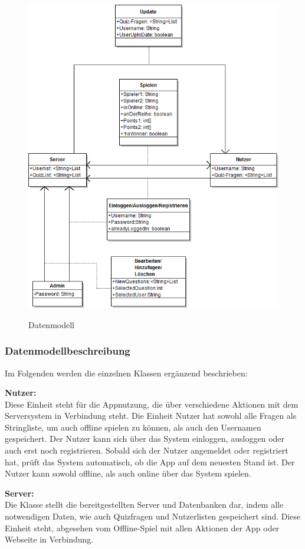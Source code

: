 \documentclass[fontsize=12pt,paper=a4,twoside]{scrartcl}
\begin{document}
\begin{figure}
	[H] \caption{Datenmodell} 
	\includegraphics[width=0.8
	\textwidth]{Bilder/datenmodell_final.png} \label{datenmodell} 
\end{figure}

\subsubsection{Datenmodellbeschreibung}

Im Folgenden werden die einzelnen Klassen ergänzend beschrieben:

\textbf{Nutzer:}\\
Diese Einheit steht für die Appnutzung, die über verschiedene Aktionen
mit dem Serversystem in Verbindung steht. Die Einheit Nutzer hat sowohl 
alle Fragen als Stringliste, um auch offline spielen zu können, als auch 
den Usernamen gespeichert. 
Der Nutzer kann sich über das System einloggen, ausloggen oder auch erst noch 
registrieren.
Sobald sich der Nutzer angemeldet oder registriert hat, prüft das System automatisch,
ob die App auf dem neuesten Stand ist. Der Nutzer kann sowohl offline, als auch online 
über das System spielen.

\textbf{Server:}\\
Die Klasse stellt die bereitgestellten Server und Datenbanken dar, indem alle 
notwendigen Daten, wie auch Quizfragen und Nutzerlisten gespeichert sind. Diese Einheit
steht, abgesehen vom Offline-Spiel mit allen Aktionen der App oder Webseite in Verbindung.
\end{document}
